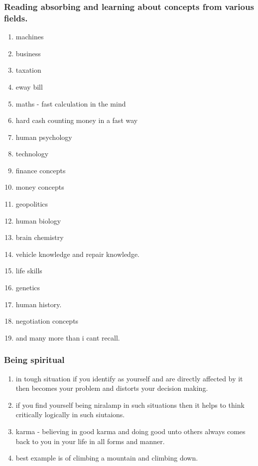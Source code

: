\documentclass[11pt]{article}
\begin{document}
\subsubsection{Reading absorbing and learning about concepts from various fields.}
\label{sec:org676f958}
\begin{enumerate}
\item machines
\label{sec:org9ac59e7}
\item business
\label{sec:orge1cb56f}
\item taxation
\label{sec:orge0fa252}
\item eway bill
\label{sec:orgc145d9b}
\item maths - fast calculation in the mind
\label{sec:orgee546f6}
\item hard cash counting money in a fast way
\label{sec:orgdcbc4d5}
\item human psychology
\label{sec:orgf6cc608}
\item technology
\label{sec:orgb8e1032}
\item finance concepts
\label{sec:orgdb93054}
\item money concepts
\label{sec:org48bb1ea}
\item geopolitics
\label{sec:org9b83f87}
\item human biology
\label{sec:orgc366ef8}
\item brain chemistry
\label{sec:orgb4e2e6e}
\item vehicle knowledge and repair knowledge.
\label{sec:orgcac0a67}
\item life skills
\label{sec:org4f41f62}
\item genetics
\label{sec:orgedc9309}
\item human history.
\label{sec:orgede9089}
\item negotiation concepts
\label{sec:org67cefa1}
\item and many more than i cant recall.
\label{sec:org2bddc6a}
\end{enumerate}
\subsubsection{Being spiritual}
\label{sec:org15332bf}
\begin{enumerate}
\item in tough situation if you identify as yourself and are directly affected by it then becomes your problem and distorts your decision making.
\label{sec:org411dbb0}
\item if you find yourself being niralamp in such situations then it helps to think critically logically in such siutaions.
\label{sec:orgb603eac}
\item karma - believing in good karma and doing good unto others always comes back to you in your life in all forms and manner.
\label{sec:org9424a4d}
\item best example is of climbing a mountain and climbing down.
\label{sec:orgaa95aa3}
\end{enumerate}
\end{document}
